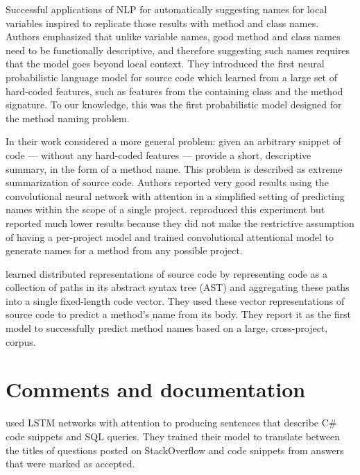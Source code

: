Successful applications of NLP for automatically suggesting names for local variables inspired \cite{Alla15} to replicate those results with method and class names. Authors emphasized that unlike variable names, good method and class names need to be functionally descriptive, and therefore suggesting such names requires that the model goes beyond local context. They introduced the first neural probabilistic language model for source code which learned from a large set of hard-coded features, such as features from the containing class and the method signature. To our knowledge, this was the first probabilistic model designed for the method naming problem.

In their work \cite{Alla16} considered a more general problem: given an arbitrary snippet of code — without any hard-coded features — provide a short, descriptive summary, in the form of a method name. This problem is described as extreme summarization of source code. Authors reported very good results using the convolutional neural network with attention in a simplified setting of predicting names within the scope of a single project. \cite{Alon18} reproduced this experiment but reported much lower results because they did not make the restrictive assumption of having a per-project model and trained convolutional attentional model to generate names for a method from any possible project.

\cite{Alon18} learned distributed representations of source code by representing code as a collection of paths in its abstract syntax tree (AST) and aggregating these paths into a single fixed-length code vector. They used these vector representations of source code to predict a method’s name from its body. They report it as the first model to successfully predict method names based on a large, cross-project, corpus.

\section{Comments and documentation}

\cite{Iyer16} used LSTM networks with attention to producing sentences that describe C\# code snippets and SQL queries. They trained their model to translate between the titles of questions posted on StackOverflow and code snippets from answers that were marked as accepted.
